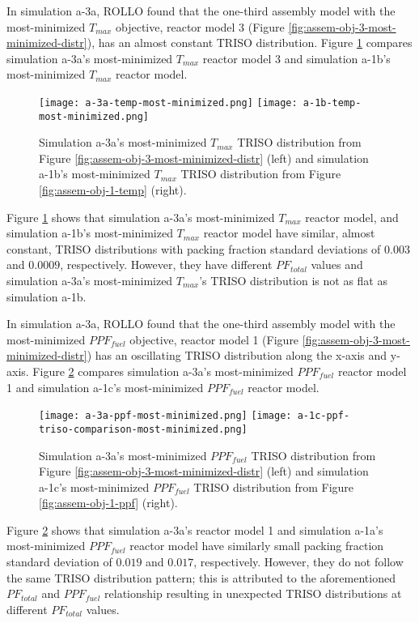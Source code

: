 In simulation a-3a, \gls{ROLLO} found that the one-third assembly model with the 
most-minimized $T_{max}$ objective, reactor model 3 (Figure 
\ref{fig:assem-obj-3-most-minimized-distr}), has an almost constant TRISO distribution.
Figure \ref{fig:a-3a-temp-triso-comparison} compares simulation a-3a's most-minimized 
$T_{max}$ reactor model 3 and simulation a-1b's most-minimized $T_{max}$ reactor model. 
\begin{figure}[htbp!]
    \centering
    \texttt{[image: a-3a-temp-most-minimized.png]} 
    \texttt{[image: a-1b-temp-most-minimized.png]} 
    \caption{Simulation a-3a's most-minimized $T_{max}$ TRISO distribution 
    from Figure \ref{fig:assem-obj-3-most-minimized-distr} (left) and simulation a-1b's 
    most-minimized $T_{max}$ TRISO distribution from Figure 
    \ref{fig:assem-obj-1-temp} (right).}
    \label{fig:a-3a-temp-triso-comparison}
\end{figure}
Figure \ref{fig:a-3a-temp-triso-comparison} shows that simulation a-3a's most-minimized 
$T_{max}$ reactor model, and simulation a-1b's most-minimized $T_{max}$ reactor model 
have similar, almost constant, TRISO distributions with packing fraction standard 
deviations of $0.003$ and $0.0009$, respectively.
However, they have different $PF_{total}$ values and simulation a-3a's most-minimized 
$T_{max}$'s TRISO distribution is not as flat as simulation a-1b. 

In simulation a-3a, \gls{ROLLO} found that the one-third assembly model with the 
most-minimized $PPF_{fuel}$ objective, reactor model 1 (Figure 
\ref{fig:assem-obj-3-most-minimized-distr}) has an oscillating TRISO distribution 
along the x-axis and y-axis.
Figure \ref{fig:a-3a-ppf-triso-comparison} compares simulation a-3a's most-minimized 
$PPF_{fuel}$ reactor model 1 and simulation a-1c's most-minimized $PPF_{fuel}$ reactor 
model. 
\begin{figure}[htbp!]
    \centering
    \texttt{[image: a-3a-ppf-most-minimized.png]} 
    \texttt{[image: a-1c-ppf-triso-comparison-most-minimized.png]} 
    \caption{Simulation a-3a's most-minimized $PPF_{fuel}$ TRISO distribution 
    from Figure \ref{fig:assem-obj-3-most-minimized-distr} (left) and simulation a-1c's 
    most-minimized $PPF_{fuel}$ TRISO distribution from Figure 
    \ref{fig:assem-obj-1-ppf} (right).}
    \label{fig:a-3a-ppf-triso-comparison}
\end{figure}
Figure \ref{fig:a-3a-ppf-triso-comparison} shows that simulation a-3a's reactor model 1 
and simulation a-1a's most-minimized $PPF_{fuel}$ reactor model have similarly small 
packing fraction standard deviation of  $0.019$ and $0.017$, respectively. 
However, they do not follow the same TRISO distribution pattern; this is 
attributed to the aforementioned $PF_{total}$ and $PPF_{fuel}$ relationship 
resulting in unexpected TRISO distributions at different $PF_{total}$ values. 

